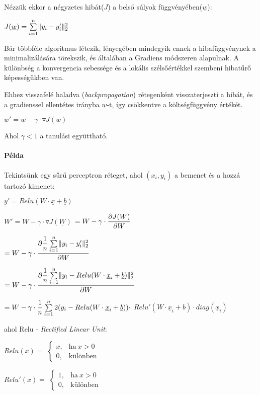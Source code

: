 \noindent
Nézzük ekkor a négyzetes hibát($ J $) a belső súlyok függvényében($ \underline{w} $):

$ J(\underline{w}) = \sum\limits_{{i}=1}^{n} \lVert y_i-y_i'\rVert_2^2 $

\noindent
Bár többféle algoritmus létezik, lényegében mindegyik ennek a hibafüggvénynek
a minimalizálására törekszik, és általában a Gradiens módszeren alapulnak.
A különbség a konvergencia sebessége és a lokális szélsőértékkel szembeni 
hibatűrő képességükben van.

Ehhez visszafelé haladva (\textit{backpropagation}) rétegenként visszaterjeszti a hibát,
és a gradienssel ellentétes irányba $ \underline{w} $-t, így csökkentve a költségfüggvény értékét.


$ \underline{w}' = \underline{w} - \gamma \cdot \triangledown J(\underline{w})$

\noindent
Ahol $ \gamma < 1 $ a tanulási együttható.


\noindent
\paragraph{Példa}
Tekintsünk egy sűrű perceptron réteget, ahol $ (x_i, y_i) $ a 
bemenet és a hozzá tartozó kimenet:

$ \underline{y}' = Relu(W \cdot \underline{x} + \underline{b}) $

$ W' = W - \gamma \cdot  \triangledown  J(\underline{W})$
$ = W - \gamma \cdot \dfrac{\partial {J(W)}}{\partial {W}} $

$ = W - \gamma \cdot  \dfrac{\partial { \dfrac{1}{n} \sum\limits_{{i}=1}^{n} \lVert y_i-y_i'\rVert_2^2}}{\partial {W}} $


$ = W - \gamma \cdot \dfrac{\partial { \dfrac{1}{n} \sum\limits_{{i}=1}^{n} \lVert y_i-Relu(W \cdot \underline{x}_i + \underline{b})\rVert_2^2}}{\partial {W}} $

$ = W - \gamma \cdot \dfrac{1}{n} \sum\limits_{{i}=1}^{n} 2 (y_i-Relu(W \cdot \underline{x}_i + \underline{b})) \cdot   $
$ Relu'(W \cdot \underline{x}_i + b) \cdot  diag(\underline{x}_i) $


\noindent
ahol Relu - \textit{Rectified Linear Unit}:


$ Relu(x) =  $
$ \begin{cases}
x, & \text{ha}\ x > 0 \\
0, & \text{különben}
\end{cases} $

$ Relu'(x) =  $
$ \begin{cases}
1, & \text{ha}\ x > 0 \\
0, & \text{különben}
\end{cases} $

